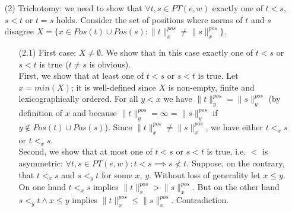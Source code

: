 \documentclass[AMA,STIX1COL]{WileyNJD-v2}
\newcommand{\PT}{PT}
\newcommand{\pnorm}[2]{\|{#1}\|^{pos}_{#2}}
\begin{document}
\begin{proofEnd}
\begin{itemize}[itemsep=0.3em, topsep=0.5em]
        \item[(2)]
            Trichotomy: we need to show that $\forall t, s \in \PT(e, w)$
            exactly one of $t < s$, $s < t$ or $t = s$ holds.
            Consider the set of positions where norms of $t$ and $s$ disagree
            $X = \{x \in Pos(t) \cup Pos(s) : \pnorm{t}{x} \neq \pnorm{s}{x}\}$.
            \begin{itemize}[itemsep=0.5em]
                \item[(2.1)] First case: $X \neq \emptyset$.
                    We show that in this case exactly one of $t < s$ or $s < t$ is true
                    ($t \neq s$ is obvious).
                    \\[0.5em]
                    First, we show that at least one of $t < s$ or $s < t$ is true.
                    Let $x = min(X)$; it is well-defined since $X$ is non-empty, finite and lexicographically ordered.
                    For all $y < x$ we have $\pnorm{t}{y} = \pnorm{s}{y}$ (by definition of $x$
                    and because $\pnorm{t}{y} = \infty = \pnorm{s}{y}$ if $y \not\in Pos(t) \cup Pos(s)$).
                    Since $\pnorm{t}{x} \neq \pnorm{s}{x}$, we have either $t <_x s$ or $t <_x s$.
                    \\[0.5em]
                    Second, we show that at most one of $t < s$ or $s < t$ is true,
                    i.e. $<$ is asymmetric: $\forall t, s \in \PT(e, w) : t < s \implies s \not< t$.
                    Suppose, on the contrary, that $t <_x s$ and $s <_y t$ for some $x$, $y$.
                    Without loss of generality let $x \leq y$.
                    On one hand $t <_x s$ implies $\pnorm{t}{x} > \pnorm{s}{x}$.
                    But on the other hand $s <_y t \wedge x \leq y$ implies $\pnorm{t}{x} \leq \pnorm{s}{x}$.
                    Contradiction.


\end{itemize}
\end{itemize}
\end{proofEnd}
\end{document}
